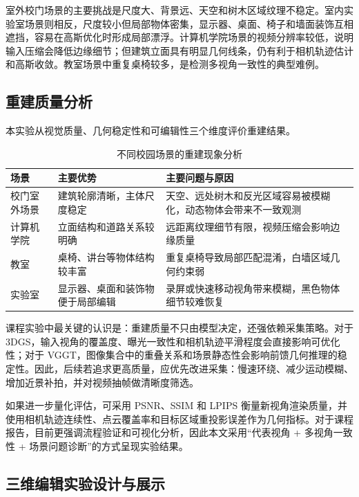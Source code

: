 \documentclass[12pt, a4paper]{article}
\begin{document}
室外校门场景的主要挑战是尺度大、背景远、天空和树木区域纹理不稳定。室内实验室场景则相反，尺度较小但局部物体密集，显示器、桌面、椅子和墙面装饰互相遮挡，容易在高斯优化时形成局部漂浮。计算机学院场景的视频分辨率较低，说明输入压缩会降低边缘细节；但建筑立面具有明显几何线条，仍有利于相机轨迹估计和高斯收敛。教室场景中重复桌椅较多，是检测多视角一致性的典型难例。

\subsection{重建质量分析}

本实验从视觉质量、几何稳定性和可编辑性三个维度评价重建结果。

\begin{table}[H]
  \centering
  \caption{不同校园场景的重建现象分析}
  \begin{tabularx}{\linewidth}{p{2.8cm} p{3.2cm} X}
    \toprule
    \textbf{场景} & \textbf{主要优势} & \textbf{主要问题与原因} \\
    \midrule
    校门室外场景 & 建筑轮廓清晰，主体尺度稳定 & 天空、远处树木和反光区域容易被模糊化，动态物体会带来不一致观测 \\
    计算机学院 & 立面结构和道路关系较明确 & 远距离纹理细节有限，视频压缩会影响边缘质量 \\
    教室 & 桌椅、讲台等物体结构较丰富 & 重复桌椅导致局部匹配混淆，白墙区域几何约束弱 \\
    实验室 & 显示器、桌面和装饰物便于局部编辑 & 录屏或快速移动视角带来模糊，黑色物体细节较难恢复 \\
    \bottomrule
  \end{tabularx}
\end{table}

课程实验中最关键的认识是：重建质量不只由模型决定，还强依赖采集策略。对于 3DGS，输入视角的覆盖度、曝光一致性和相机轨迹平滑程度会直接影响可优化性；对于 VGGT，图像集合中的重叠关系和场景静态性会影响前馈几何推理的稳定性。因此，后续若追求更高质量，应优先改进采集：慢速环绕、减少运动模糊、增加近景补拍，并对视频抽帧做清晰度筛选。

如果进一步量化评估，可采用 PSNR、SSIM 和 LPIPS 衡量新视角渲染质量，并使用相机轨迹连续性、点云覆盖率和目标区域重投影误差作为几何指标。对于课程报告，目前更强调流程验证和可视化分析，因此本文采用“代表视角 + 多视角一致性 + 场景问题诊断”的方式呈现实验结果。

\subsection{三维编辑实验设计与展示}
\end{document}

